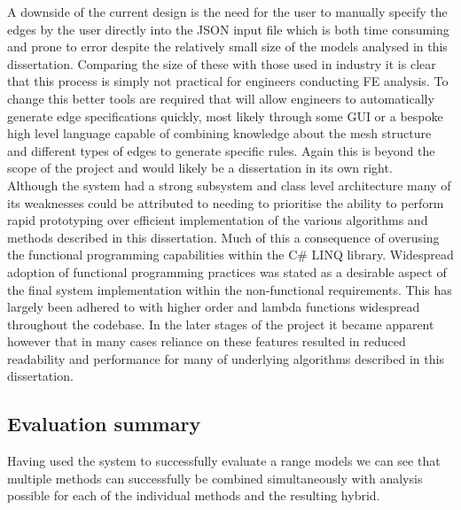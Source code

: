 \noindent
A downside of the current design is the need for the user to manually specify the edges by the user directly into the JSON input file which is both time consuming and prone to error despite the relatively small size of the models analysed in this dissertation. Comparing the size of these with those used in industry it is clear that this process is simply not practical for engineers conducting FE analysis. To change this better tools are required that will allow engineers to automatically generate edge specifications quickly, most likely through some GUI or a bespoke high level language capable of combining knowledge about the mesh structure and different types of edges to generate specific rules. Again this is beyond the scope of the project and would likely be a dissertation in its own right. \\


\noindent
Although the system had a strong subsystem and class level architecture many of its weaknesses could be attributed to needing to prioritise the ability to perform rapid prototyping over efficient implementation of the various algorithms and methods described in this dissertation. Much of this a consequence of overusing the functional programming capabilities within the C\# LINQ library. Widespread adoption of functional programming practices was stated as a desirable aspect of the final system implementation within the non-functional requirements. This has largely been adhered to with  higher order and lambda functions widespread throughout the codebase. In the later stages of the project it became apparent however that in many cases reliance on these features resulted in reduced readability and performance for many of underlying algorithms described in this dissertation. \\




\subsection{Evaluation summary}
Having used the system to successfully evaluate a range models we can see that multiple methods can successfully be combined simultaneously with analysis possible for each of the individual methods and the resulting hybrid.